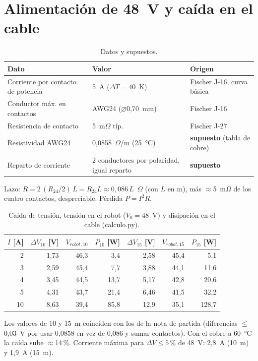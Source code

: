 \documentclass[11pt,a4paper]{article}
\begin{document}
\section{Alimentación de 48~V y caída en el cable}
\begin{table}[H]\centering
  \caption{Datos y supuestos.}
  \begin{tabular}{p{5.4cm} p{4.6cm} p{4.6cm}}
    \toprule
    Dato & Valor & Origen \\
    \midrule
    Corriente por contacto de potencia & 5~A ($\Delta T=40$~K) & Fischer J-16, curva básica \\
    Conductor máx. en contactos & AWG24 (\ensuremath{\varnothing}0,70~mm) & Fischer J-16 \\
    Resistencia de contacto & 5~m$\Omega$ típ. & Fischer J-27 \\
    Resistividad AWG24 & 0,0858~$\Omega$/m (25~°C) & \textbf{supuesto} (tabla de cobre) \\
    Reparto de corriente & 2 conductores por polaridad, igual reparto & \textbf{supuesto} \\
    \bottomrule
  \end{tabular}
\end{table}
Lazo: $R=2\,(R_{24}/2)\,L=R_{24}L\approx0{,}086\,L$~$\Omega$ (con $L$ en m), más $\approx$5~m$\Omega$ de los cuatro contactos, despreciable. Pérdida $P=I^2R$.

\begin{table}[H]\centering
  \caption{Caída de tensión, tensión en el robot ($V_0=48$~V) y disipación en el cable (calculo.py).}
  \begin{tabular}{r r r r r r r}
    \toprule
    $I$ [A] & $\Delta V_{10}$ [V] & $V_{robot,10}$ & $P_{10}$ [W] & $\Delta V_{15}$ [V] & $V_{robot,15}$ & $P_{15}$ [W] \\
    \midrule
    2 & 1,73 & 46,3 & 3,4 & 2,58 & 45,4 & 5,1 \\
    3 & 2,59 & 45,4 & 7,7 & 3,88 & 44,1 & 11,6 \\
    4 & 3,45 & 44,5 & 13,7 & 5,17 & 42,8 & 20,6 \\
    5 & 4,31 & 43,7 & 21,4 & 6,46 & 41,5 & 32,2 \\
    10 & 8,63 & 39,4 & 85,8 & 12,9 & 35,1 & 128,7 \\
    \bottomrule
  \end{tabular}
\end{table}

Los valores de 10 y 15~m coinciden con los de la nota de partida (diferencias $\le$0,03~V por usar 0,0858 en vez de 0,086 y sumar contactos). Con el cobre a 60~°C la caída sube $\approx$14\,\%. Corriente máxima para $\Delta V\le 5$\,\% de 48~V: 2,8~A (10~m) y 1,9~A (15~m).
\end{document}
